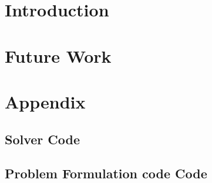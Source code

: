 \documentclass[MTech]{iitmdiss}
\begin{document}
\acknowledgements


\abstract

\pagebreak


\begin{singlespace}
\tableofcontents
\thispagestyle{empty}

\listoftables
{}
\listoffigures
{}
\end{singlespace}

\pagebreak


%
%
\chapter{Introduction}


\chapter{Future Work}

\chapter{Appendix}

\section{Solver Code}

\pagebreak
\section{Problem Formulation code Code}

\pagebreak

\pagebreak

\pagebreak

\pagebreak

\pagebreak

\pagebreak

\pagebreak
\begin{singlespace}
  \begin{small}
	
  \end{small}
\end{singlespace}

\end{document}
